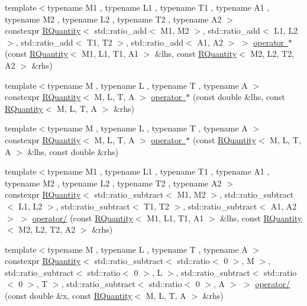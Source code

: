 \begin{DoxyCompactItemize}
\item 
{\footnotesize template$<$typename M1 , typename L1 , typename T1 , typename A1 , typename M2 , typename L2 , typename T2 , typename A2 $>$ }\\constexpr \mbox{\hyperlink{classokapi_1_1RQuantity}{R\+Quantity}}$<$ std\+::ratio\+\_\+add$<$ M1, M2 $>$, std\+::ratio\+\_\+add$<$ L1, L2 $>$, std\+::ratio\+\_\+add$<$ T1, T2 $>$, std\+::ratio\+\_\+add$<$ A1, A2 $>$ $>$ \mbox{\hyperlink{namespaceokapi_a48bcd0bd9113d86c24325eb1003709de}{operator $\ast$}} (const \mbox{\hyperlink{classokapi_1_1RQuantity}{R\+Quantity}}$<$ M1, L1, T1, A1 $>$ \&lhs, const \mbox{\hyperlink{classokapi_1_1RQuantity}{R\+Quantity}}$<$ M2, L2, T2, A2 $>$ \&rhs)
\item 
{\footnotesize template$<$typename M , typename L , typename T , typename A $>$ }\\constexpr \mbox{\hyperlink{classokapi_1_1RQuantity}{R\+Quantity}}$<$ M, L, T, A $>$ \mbox{\hyperlink{namespaceokapi_a2ff902d0db2898d581528d1aa92f7005}{operator $\ast$}} (const double \&lhs, const \mbox{\hyperlink{classokapi_1_1RQuantity}{R\+Quantity}}$<$ M, L, T, A $>$ \&rhs)
\item 
{\footnotesize template$<$typename M , typename L , typename T , typename A $>$ }\\constexpr \mbox{\hyperlink{classokapi_1_1RQuantity}{R\+Quantity}}$<$ M, L, T, A $>$ \mbox{\hyperlink{namespaceokapi_a763b1c8386a8cb4e0cb5f1174e8d91ae}{operator $\ast$}} (const \mbox{\hyperlink{classokapi_1_1RQuantity}{R\+Quantity}}$<$ M, L, T, A $>$ \&lhs, const double \&rhs)
\item 
{\footnotesize template$<$typename M1 , typename L1 , typename T1 , typename A1 , typename M2 , typename L2 , typename T2 , typename A2 $>$ }\\constexpr \mbox{\hyperlink{classokapi_1_1RQuantity}{R\+Quantity}}$<$ std\+::ratio\+\_\+subtract$<$ M1, M2 $>$, std\+::ratio\+\_\+subtract$<$ L1, L2 $>$, std\+::ratio\+\_\+subtract$<$ T1, T2 $>$, std\+::ratio\+\_\+subtract$<$ A1, A2 $>$ $>$ \mbox{\hyperlink{namespaceokapi_a5b9c69030c20a9e0d0882bd4d9546597}{operator/}} (const \mbox{\hyperlink{classokapi_1_1RQuantity}{R\+Quantity}}$<$ M1, L1, T1, A1 $>$ \&lhs, const \mbox{\hyperlink{classokapi_1_1RQuantity}{R\+Quantity}}$<$ M2, L2, T2, A2 $>$ \&rhs)
\item 
{\footnotesize template$<$typename M , typename L , typename T , typename A $>$ }\\constexpr \mbox{\hyperlink{classokapi_1_1RQuantity}{R\+Quantity}}$<$ std\+::ratio\+\_\+subtract$<$ std\+::ratio$<$ 0 $>$, M $>$, std\+::ratio\+\_\+subtract$<$ std\+::ratio$<$ 0 $>$, L $>$, std\+::ratio\+\_\+subtract$<$ std\+::ratio$<$ 0 $>$, T $>$, std\+::ratio\+\_\+subtract$<$ std\+::ratio$<$ 0 $>$, A $>$ $>$ \mbox{\hyperlink{namespaceokapi_a531581f5f3bfed446a0925214c0e4664}{operator/}} (const double \&x, const \mbox{\hyperlink{classokapi_1_1RQuantity}{R\+Quantity}}$<$ M, L, T, A $>$ \&rhs)

\end{DoxyCompactItemize}
